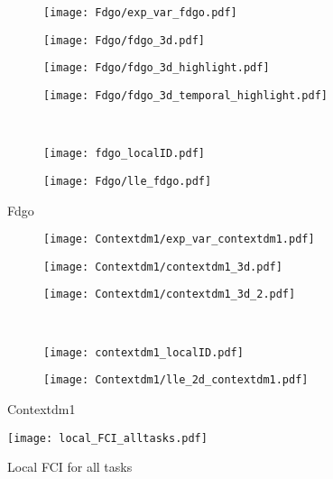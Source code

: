 \documentclass[11pt,a4paper]{article}
\begin{document}
\begin{figure}
 \centering
 \begin{subfigure}[b]{0.20\textwidth}
   \centering
   \texttt{[image: Fdgo/exp\_var\_fdgo.pdf]}
 \end{subfigure}\label{fig:Fdgo:exp_var_fdgo}
 \begin{subfigure}[b]{0.23\textwidth}
   \centering
   \texttt{[image: Fdgo/fdgo\_3d.pdf]}
 \end{subfigure}\label{fig:Fdgo:fdgo_3d}
 \begin{subfigure}[b]{0.18\textwidth}
   \centering
   \texttt{[image: Fdgo/fdgo\_3d\_highlight.pdf]}
 \end{subfigure}\label{fig:Fdgo:fdgo_3d_highlight}
 \begin{subfigure}[b]{0.35\textwidth}
   \centering
   \texttt{[image: Fdgo/fdgo\_3d\_temporal\_highlight.pdf]}
 \end{subfigure}\label{fig:Fdgo:fdgo_3d_temporal}\\
  \begin{subfigure}[b]{0.45\textwidth}
    \centering
    \texttt{[image: fdgo\_localID.pdf]}
  \end{subfigure}\label{fig:Fdgo:hist2D_fdgo_localFCI}
 \begin{subfigure}[b]{0.45\textwidth}
    \centering
    \texttt{[image: Fdgo/lle\_fdgo.pdf]}
  \end{subfigure}\label{fig:Fdgo:lle_2d_fdgo}
 \caption{Fdgo}\label{fig:Fdgo}
\end{figure}


\begin{figure}
 \centering
 \begin{subfigure}[b]{0.25\textwidth}
   \centering
   \texttt{[image: Contextdm1/exp\_var\_contextdm1.pdf]}
 \end{subfigure}\label{fig:Contextdm1:exp_var_contextdm1}
 \begin{subfigure}[b]{0.30\textwidth}
   \centering
   \texttt{[image: Contextdm1/contextdm1\_3d.pdf]}
 \end{subfigure}\label{fig:Contextdm1:contextdm1_3d}
 \begin{subfigure}[b]{0.40\textwidth}
   \centering
   \texttt{[image: Contextdm1/contextdm1\_3d\_2.pdf]}
 \end{subfigure}\label{fig:Contextdm1:contextdm1_3d_2}\\
  \begin{subfigure}[b]{0.45\textwidth}
    \centering
    \texttt{[image: contextdm1\_localID.pdf]}
  \end{subfigure}\label{fig:Contextdm1:hist2D_contextdm1_localFCI}
 \begin{subfigure}[b]{0.45\textwidth}
    \centering
    \texttt{[image: Contextdm1/lle\_2d\_contextdm1.pdf]}
  \end{subfigure}\label{fig:Contextdm1:lle_2d_contextdm1}
 \caption{Contextdm1}\label{fig:Contextdm1}
\end{figure}



\begin{figure}
    \centering
    \texttt{[image: local\_FCI\_alltasks.pdf]}
    \caption{Local FCI for all tasks}
\end{figure}
\end{document}
